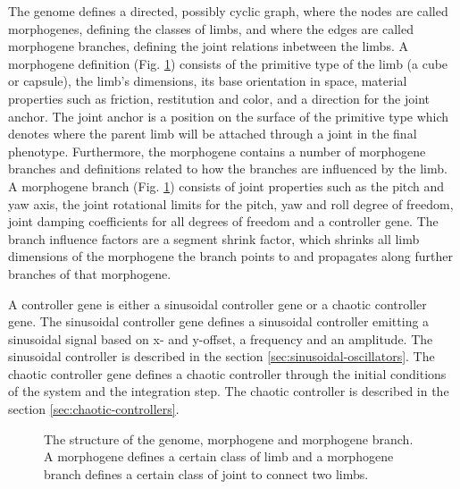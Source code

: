 \documentclass[main]{subfiles}
\begin{document}

The genome defines a directed, possibly cyclic graph, where the nodes are called morphogenes, defining the classes of limbs, and where the edges are called morphogene branches, defining the joint relations inbetween the limbs. A morphogene definition (Fig. \ref{figure:genome-structure}) consists of the primitive type of the limb (a cube or capsule), the limb's dimensions, its base orientation in space, material properties such as friction, restitution and color, and a direction for the joint anchor. The joint anchor is a position on the surface of the primitive type which denotes where the parent limb will be attached through a joint in the final phenotype. Furthermore, the morphogene contains a number of morphogene branches and definitions related to how the branches are influenced by the limb. \\

A morphogene branch (Fig. \ref{figure:genome-structure}) consists of joint properties such as the pitch and yaw axis, the joint rotational limits for the pitch, yaw and roll degree of freedom, joint damping coefficients for all degrees of freedom and a controller gene.
The branch influence factors are a segment shrink factor, which shrinks all limb dimensions of the morphogene the branch points to and propagates along further branches of that morphogene.

A controller gene is either a sinusoidal controller gene or a chaotic controller gene.  The sinusoidal controller gene defines a sinusoidal controller emitting a sinusoidal signal based on x- and y-offset, a frequency and an amplitude. The sinusoidal controller is described in the section \ref{sec:sinusoidal-oscillators}. The chaotic controller gene defines a chaotic controller through the initial conditions of the system and the integration step. The chaotic controller is described in the section \ref{sec:chaotic-controllers}.

\begin{figure}[H]
\center


\caption[Indirectly encoded genome structure]{The structure of the genome, morphogene and morphogene branch. A morphogene defines a certain class of limb and a morphogene branch defines a certain class of joint to connect two limbs.}
\label{figure:genome-structure}
\end{figure}
\end{document}
